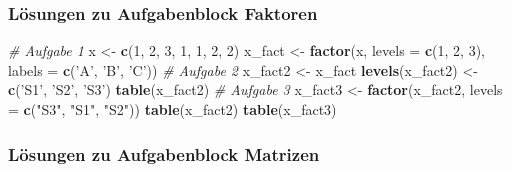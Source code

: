 \documentclass[]{article}
\newenvironment{Shaded}{\begin{snugshade}}{\end{snugshade}}
\newcommand{\KeywordTok}[1]{\textcolor[rgb]{0.13,0.29,0.53}{\textbf{#1}}}
\newcommand{\DataTypeTok}[1]{\textcolor[rgb]{0.13,0.29,0.53}{#1}}
\newcommand{\DecValTok}[1]{\textcolor[rgb]{0.00,0.00,0.81}{#1}}
\newcommand{\StringTok}[1]{\textcolor[rgb]{0.31,0.60,0.02}{#1}}
\newcommand{\CommentTok}[1]{\textcolor[rgb]{0.56,0.35,0.01}{\textit{#1}}}
\newcommand{\NormalTok}[1]{#1}
\begin{document}
\subsubsection*{Lösungen zu Aufgabenblock
Faktoren}\label{losungen-zu-aufgabenblock-faktoren}

\begin{Shaded}
\begin{Highlighting}[]
    \CommentTok{# Aufgabe 1}
\NormalTok{    x       <-}\StringTok{ }\KeywordTok{c}\NormalTok{(}\DecValTok{1}\NormalTok{, }\DecValTok{2}\NormalTok{, }\DecValTok{3}\NormalTok{, }\DecValTok{1}\NormalTok{, }\DecValTok{1}\NormalTok{, }\DecValTok{2}\NormalTok{, }\DecValTok{2}\NormalTok{)}
\NormalTok{    x_fact  <-}\StringTok{ }\KeywordTok{factor}\NormalTok{(x, }\DataTypeTok{levels =} \KeywordTok{c}\NormalTok{(}\DecValTok{1}\NormalTok{, }\DecValTok{2}\NormalTok{, }\DecValTok{3}\NormalTok{), }\DataTypeTok{labels =} \KeywordTok{c}\NormalTok{(}\StringTok{'A'}\NormalTok{, }\StringTok{'B'}\NormalTok{, }\StringTok{'C'}\NormalTok{))}
    \CommentTok{# Aufgabe 2}
\NormalTok{    x_fact2         <-}\StringTok{ }\NormalTok{x_fact}
    \KeywordTok{levels}\NormalTok{(x_fact2) <-}\StringTok{ }\KeywordTok{c}\NormalTok{(}\StringTok{'S1'}\NormalTok{, }\StringTok{'S2'}\NormalTok{, }\StringTok{'S3'}\NormalTok{)}
    \KeywordTok{table}\NormalTok{(x_fact2)}
    \CommentTok{# Aufgabe 3}
\NormalTok{    x_fact3 <-}\StringTok{ }\KeywordTok{factor}\NormalTok{(x_fact2, }\DataTypeTok{levels =} \KeywordTok{c}\NormalTok{(}\StringTok{"S3"}\NormalTok{, }\StringTok{"S1"}\NormalTok{, }\StringTok{"S2"}\NormalTok{))}
    \KeywordTok{table}\NormalTok{(x_fact2)}
    \KeywordTok{table}\NormalTok{(x_fact3)}
\end{Highlighting}
\end{Shaded}

\subsubsection*{Lösungen zu Aufgabenblock
Matrizen}\label{losungen-zu-aufgabenblock-matrizen}
\end{document}
